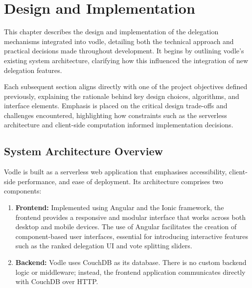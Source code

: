 \chapter{Design and Implementation}
\label{ch:design_implementation}
This chapter describes the design and implementation of the delegation mechanisms integrated into vodle, detailing both the technical approach and practical decisions made throughout development. It begins by outlining vodle's existing system architecture, clarifying how this influenced the integration of new delegation features. 

Each subsequent section aligns directly with one of the project objectives defined previously, explaining the rationale behind key design choices, algorithms, and interface elements. Emphasis is placed on the critical design trade-offs and challenges encountered, highlighting how constraints such as the serverless architecture and client-side computation informed implementation decisions.

\section{System Architecture Overview}
Vodle is built as a serverless web application that emphasises accessibility, client-side performance, and ease of deployment. Its architecture comprises two components:

\begin{enumerate}
  \item \textbf{Frontend:} Implemented using Angular and the Ionic framework, the frontend provides a responsive and modular interface that works across both desktop and mobile devices. The use of Angular facilitates the creation of component-based user interfaces, essential for introducing interactive features such as the ranked delegation UI and vote splitting sliders.
  \item \textbf{Backend:} Vodle uses CouchDB as its database. There is no custom backend logic or middleware; instead, the frontend application communicates directly with CouchDB over HTTP.
\end{enumerate}

